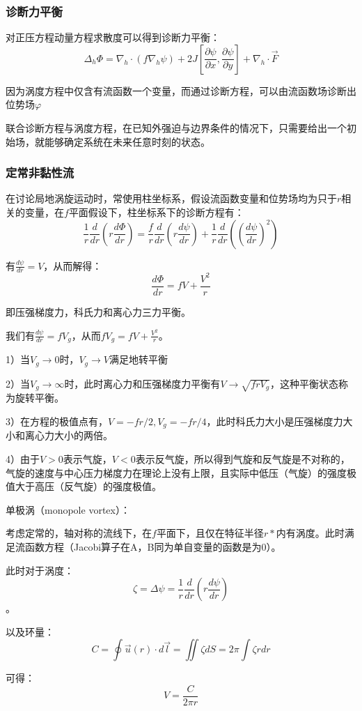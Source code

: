 \documentclass{article}
\begin{document}
\subsubsection{诊断力平衡}
对正压方程动量方程求散度可以得到诊断力平衡：
$$\Delta_h\Phi = \nabla_h\cdot(f\nabla_h\psi)+2J[\frac{\partial \psi}{\partial x},\frac{\partial \psi}{\partial y}]+\nabla_h\cdot\vec{F}$$

因为涡度方程中仅含有流函数一个变量，而通过诊断方程，可以由流函数场诊断出位势场$\varphi$

联合诊断方程与涡度方程，在已知外强迫与边界条件的情况下，只需要给出一个初始场，就能够确定系统在未来任意时刻的状态。


\subsubsection{定常非黏性流}
在讨论局地涡旋运动时，常使用柱坐标系，假设流函数变量和位势场均为只于$r$相关的变量，在$f$平面假设下，柱坐标系下的诊断方程有：
$$\frac{1}{r}\frac{d}{dr}(r\frac{d\Phi}{dr}) = \frac{f}{r}\frac{d}{dr}(r\frac{d\psi}{dr})+\frac{1}{r}\frac{d}{dr}((\frac{d\psi}{dr})^2)$$

有$\frac{d\psi}{dr}=V$，从而解得：
$$\frac{d\Phi}{dr}=fV+\frac{V^2}{r}$$

即压强梯度力，科氏力和离心力三力平衡。

我们有$\frac{d\psi}{dr}=fV_g$，从而$fV_g=fV+\frac{V^2}{r}$。

1）当$V_g\longrightarrow 0$时，$V_g\longrightarrow V$满足地转平衡

2）当$V_g\rightarrow\infty$时，此时离心力和压强梯度力平衡有$V\rightarrow\sqrt{frV_g}$，这种平衡状态称为旋转平衡。

3）在方程的极值点有，$V=-fr/2,V_g=-fr/4$，此时科氏力大小是压强梯度力大小和离心力大小的两倍。

4）由于$V>0$表示气旋，$V<0$表示反气旋，所以得到气旋和反气旋是不对称的，气旋的速度与中心压力梯度力在理论上没有上限，且实际中低压（气旋）的强度极值大于高压（反气旋）的强度极值。

单极涡（monopole vortex）：

考虑定常的，轴对称的流线下，在$f$平面下，且仅在特征半径$r*$内有涡度。此时满足流函数方程（Jacobi算子在A，B同为单自变量的函数是为$0$）。

此时对于涡度：
$$\zeta=\Delta\psi=\frac{1}{r}\frac{d}{dr}\left(r\frac{d\psi}{dr}\right)$$。

以及环量：
$$C=\oint \vec{u}(r)\cdot d\vec{l}=\iint\zeta dS=2\pi\int\zeta rdr$$

可得：
$$V = \frac{C}{2\pi r}$$
\end{document}
